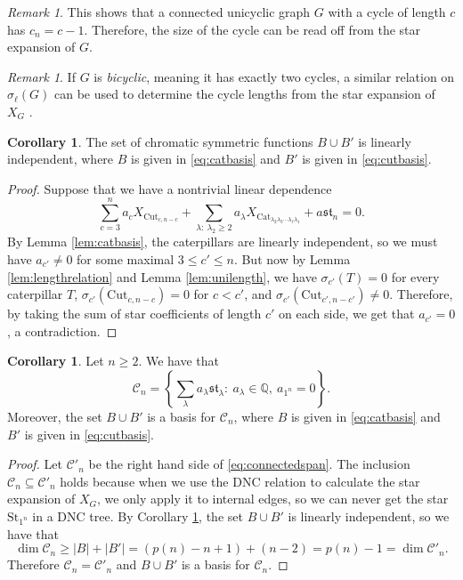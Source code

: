 \documentclass[12pt]{amsart}  %
\theoremstyle{definition}
\newtheorem{corollary}[theorem]{Corollary}
\theoremstyle{remark}
\newtheorem{remark}[theorem]{Remark}
\numberwithin{equation}{section}
\begin{document}
\begin{remark}
This shows that a connected unicyclic graph $G$ with a cycle of length $c$ has $c_n=c-1$. Therefore, the size of the cycle can be read off from the star expansion of $G$.
\end{remark}

\begin{remark}
If $G$ is \emph{bicyclic}, meaning it has exactly two cycles, a similar relation on $\sigma_\ell(G)$ can be used to determine the cycle lengths from the star expansion of $X_G$ \cite[Theorem 7.6]{chromunicyclic}.
\end{remark}

\begin{corollary}\label{cor:catcutind}
The set of chromatic symmetric functions $B\cup B'$ is linearly independent, where $B$ is given in \eqref{eq:catbasis} and $B'$ is given in \eqref{eq:cutbasis}.
\end{corollary}

\begin{proof}
Suppose that we have a nontrivial linear dependence
\begin{equation}
\sum_{c=3}^na_cX_{\text{Cut}_{c,n-c}}+\sum_{\lambda: \ \lambda_2\geq 2}a_\lambda X_{\text{Cat}_{\lambda_2\lambda_3\cdots\lambda_\ell\lambda_1}}+a\mathfrak{st}_n=0.
\end{equation}
By Lemma \ref{lem:catbasis}, the caterpillars are linearly independent, so we must have $a_{c'}\neq 0$ for some maximal $3\leq c'\leq n$. But now by Lemma \ref{lem:lengthrelation} and Lemma \ref{lem:unilength}, we have $\sigma_{c'}(T)=0$ for every caterpillar $T$, $\sigma_{c'}(\text{Cut}_{c,n-c})=0$ for $c<c'$, and $\sigma_{c'}(\text{Cut}_{c',n-c'})\neq 0$. Therefore, by taking the sum of star coefficients of length $c'$ on each side, we get that $a_{c'}=0$, a contradiction. 
\end{proof}

\begin{corollary}\label{cor:catcutbasis}
Let $n\geq 2$. We have that
\begin{equation}\label{eq:connectedspan}
\mathcal C_n=\left\{\sum_\lambda a_\lambda\mathfrak{st}_\lambda: \ a_\lambda\in\mathbb Q, \ a_{1^n}=0\right\}.
\end{equation}
Moreover, the set $B\cup B'$ is a basis for $\mathcal C_n$, where $B$ is given in \eqref{eq:catbasis} and $B'$ is given in \eqref{eq:cutbasis}.
\end{corollary}

\begin{proof}
Let $\mathcal C'_n$ be the right hand side of \eqref{eq:connectedspan}. The inclusion $\mathcal C_n\subseteq\mathcal C'_n$ holds because when we use the DNC relation to calculate the star expansion of $X_G$, we only apply it to internal edges, so we can never get the star $\text{St}_{1^n}$ in a DNC tree. By Corollary \ref{cor:catcutind}, the set $B\cup B'$ is linearly independent, so we have that \begin{equation}\dim\mathcal C_n\geq |B|+|B'|=(p(n)-n+1)+(n-2)=p(n)-1=\dim\mathcal C'_n.\end{equation}
Therefore $\mathcal C_n=\mathcal C'_n$ and $B\cup B'$ is a basis for $\mathcal C_n$.
\end{proof}
\end{document}
